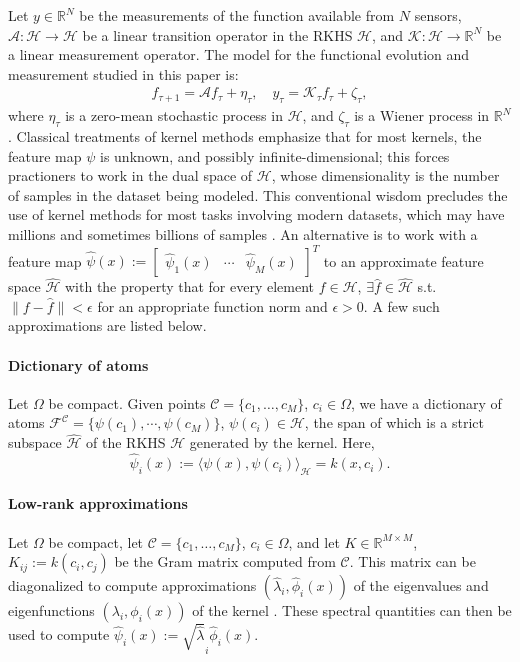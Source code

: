 \documentclass[letterpaper,12pt,peerreviewca,draftcls]{IEEEtran}
\newcommand{\e}{\epsilon}
\newcommand{\la}{\lambda}
\newcommand{\R}{\mathbb{R}}
\def\l{\langle}
\def\r{\rangle}
\newcommand{\fspace}{\mathcal{H}}
\newcommand{\fmap}{\psi}
\newcommand{\sysop}{\mathcal{A}}
\newcommand{\measop}{\mathcal{K}}
\newcommand{\kernel}{k}
\newcommand{\eval}{\la}
\newcommand{\efunc}{\ensuremath{\phi}}
\newcommand{\empEfunc}{\ensuremath{\widehat \phi}}
\newcommand{\empEval}{\ensuremath{\widehat \la}}
\newcommand{\empK}{\ensuremath{K}}
\newcommand{\dom}{\Omega}
\newcommand{\nsamp}{N}
\newcommand{\ncent}{M}
\newcommand{\shCent}{\mathcal{C}}
\newcommand{\shCentLong}{\{c_1,\dots,c_{\ncent}\}}
\newcommand{\eqlabel}[1]{\label{eq:#1}}
\def\l{\langle}
\def\r{\rangle}
\newcommand{\fspaceApprox}{\widehat{\fspace}}
\newcommand{\fmapApprox}{\widehat{\fmap}}
\newcommand{\fspaceEl}{f}
\newcommand{\fspaceApproxEl}{\widehat{\fspaceEl}}
\newcommand{\Atoms}{\mathcal{F}^{\shCent}}
\newcommand{\tindex}{\tau}
\begin{document}
Let $y\in\R^{\nsamp}$ be the measurements of the function available from $\nsamp$ sensors, $\sysop:\fspace\to\fspace$ be a linear transition operator in the RKHS $\fspace$, and $\measop:\fspace\to\R^{\nsamp}$ be a linear measurement operator. The model for the functional evolution and measurement studied in this paper is:
\begin{align}\eqlabel{ideal_lin_evol}
 f_{\tindex+1} = \sysop f_{\tindex} + \eta_{\tindex}, \quad
 y_{\tindex} = \measop_{\tindex} f_{\tindex} + \zeta_{\tindex},
\end{align}
where $\eta_{\tindex}$ is a zero-mean stochastic process in $\fspace$, and $\zeta_{\tindex}$ is a Wiener process in $\R^{\nsamp}$. 
Classical treatments of kernel methods emphasize that for most kernels, the feature map $\fmap$ is unknown, and possibly infinite-dimensional; this forces practioners to work in the dual space of $\fspace$, whose dimensionality is the number of samples in the dataset being modeled. This conventional wisdom precludes the use of kernel methods for most tasks involving modern datasets, which may have millions and sometimes billions of samples \cite{rahimi2007random}. An alternative is to work with a feature map 
$\fmapApprox(x) := \left[\begin{smallmatrix}
  \fmapApprox_1(x) & \cdots & \fmapApprox_{\ncent}(x)
 \end{smallmatrix}\right]^T$ to an approximate feature space
 $\fspaceApprox$ with the property that for every element $\fspaceEl\in\fspace$, $\exists\fspaceApproxEl\in\fspaceApprox$ s.t. $\|\fspaceEl-\fspaceApproxEl\| < \e$ for an appropriate function norm and $\e>0$. A few such approximations are listed below.
 
\paragraph{Dictionary of atoms} Let $\dom$ be compact. Given points $\shCent = \shCentLong$, $c_i\in\dom$, we have a dictionary of atoms $\Atoms = \{\fmap(c_1), \cdots , \fmap(c_{\ncent})\}$, $\fmap(c_i)\in\fspace$, the span of which is a strict subspace $\fspaceApprox$ of the RKHS $\fspace$ generated by the kernel. Here, 
 \begin{equation}\eqlabel{fmap_dict}
 \fmapApprox_i(x) := \l\fmap(x), \fmap(c_i)\r_{\fspace} = \kernel(x, c_i).
 \end{equation}
\paragraph{Low-rank approximations} Let $\dom$ be compact, let $\shCent = \shCentLong$, $c_i\in\dom$, and let $\empK\in\R^{\ncent\times\ncent}$, $\empK_{ij}:=\kernel(c_i,c_j)$ be the Gram matrix computed from $\shCent$. This matrix can be diagonalized to compute approximations $(\empEval_i, \empEfunc_i(x))$ of the eigenvalues and eigenfunctions $(\eval_i, \efunc_i(x))$ of the kernel \cite{williams2001using2}. These spectral quantities can then be used to compute  $ \fmapApprox_i(x):=\sqrt{\empEval}_i\empEfunc_i(x)$.
\end{document}
